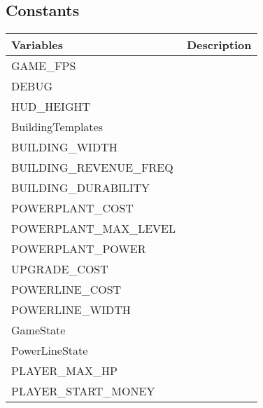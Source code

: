 \clearpage

\subsection*{Constants}

	\begin{table}[H]
	\begin{tabular}{p{6cm} | p{6cm} }

	\hline
	\rowcolor{gray}
	Variables & Description \\ \hline
	GAME\_FPS & \\ \hline
	DEBUG & \\ \hline
	HUD\_HEIGHT & \\ \hline
	BuildingTemplates & \\ \hline
	BUILDING\_WIDTH & \\ \hline
	BUILDING\_REVENUE\_FREQ & \\ \hline
	BUILDING\_DURABILITY & \\ \hline
	POWERPLANT\_COST & \\ \hline
	POWERPLANT\_MAX\_LEVEL & \\ \hline
	POWERPLANT\_POWER & \\ \hline
	UPGRADE\_COST & \\ \hline
	POWERLINE\_COST & \\ \hline
	POWERLINE\_WIDTH & \\ \hline
	GameState & \\ \hline
	PowerLineState & \\ \hline
	PLAYER\_MAX\_HP & \\ \hline
	PLAYER\_START\_MONEY & \\ \hline

	\end{tabular}
	\end{table}
